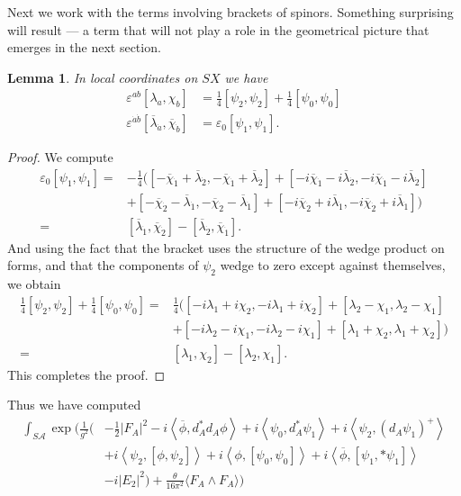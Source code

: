 \documentclass[twoside]{amsart}
\newtheorem{lemma}{Lemma}
\renewcommand{\epsilon}{\varepsilon}
\newcommand{\enm}[1]{\ensuremath{#1}}
\renewcommand{\aa}{\enm{\mathcal{A}}}
\newcommand{\sa}{\enm{S\aa}}
\newcommand{\ip}[2]{\enm{\left<#1,#2\right>}}
\renewcommand{\bar}[1]{\overline{#1}}
\renewcommand{\epsilon}{\varepsilon}
\newcommand{\cbi}[1]{\enm{\bar{\chi}_{\dot{#1}}}}
\newcommand{\lbi}[1]{\enm{\bar{\lambda}_{\dot{#1}}}}
\begin{document}
Next we work with the terms involving brackets of spinors.  Something
surprising will result --- a term that will not play a role in the
geometrical picture that emerges in the next section.
\begin{lemma}
    \label{lemma:brackets}
    In local coordinates on \( SX \) we have
    \begin{align}
        \epsilon^{ab}[\lambda_{a},\chi_{b}] &= \frac{1}{4}[\psi_{2},\psi_{2}] +
        \frac{1}{4}[\psi_{0},\psi_{0}] \\
        \epsilon^{\dot{a}\dot{b}}[\lbi{a},\cbi{b}] &=
        \epsilon_{0}[\psi_{1},\psi_{1}].
    \end{align}
\end{lemma}
\begin{proof} We compute
\begin{align*}
    \epsilon_{0}[\psi_{1},\psi_{1}] =&
    -\frac{1}{4}([-\cbi{1}+\lbi{2}, -\cbi{1}+\lbi{2}] +
    [-i\cbi{1}-i\lbi{2}, -i\cbi{1}-i\lbi{2}] \\ &+
    [-\cbi{2}-\lbi{1}, -\cbi{2}-\lbi{1}]+
    [-i\cbi{2}+i\lbi{1}, -i\cbi{2}+i\lbi{1}]) \\
    =& [\lbi{1},\cbi{2}] - [\lbi{2},\cbi{1}].
\end{align*}
And using the fact that the bracket uses the structure of the wedge
product on forms, and that the components of \( \psi_{2} \) wedge to
zero except against themselves, we obtain
\begin{align*}
    \frac{1}{4}[\psi_{2},\psi_{2}]+\frac{1}{4}[\psi_{0},\psi_{0}] =&
    \frac{1}{4}([-i\lambda_{1} + i\chi_{2}, -i\lambda_{1} + i\chi_{2}] +
    [\lambda_{2} - \chi_{1}, \lambda_{2} - \chi_{1}] \\
    &+
    [-i\lambda_{2} - i\chi_{1}, -i\lambda_{2} - i\chi_{1}] +
    [\lambda_{1} + \chi_{2}, \lambda_{1} + \chi_{2}]) \\
    =& [\lambda_{1},\chi_{2}]-[\lambda_{2},\chi_{1}].
\end{align*}
This completes the proof.
\end{proof}
Thus we have computed
\begin{align}
    \int_{\sa} %
  \exp\Big(\frac{1}{g^{2}}%
    \Big(
    &-\frac{1}{2}|F_{A}|^{2}
    - i\ip{\bar{\phi}}{d_{A}^{*}d_{A}\phi}
    +i\ip{\psi_{0}}{d_{A}^{*}\psi_{1}}
    + i\ip{\psi_{2}}{(d_{A}\psi_{1})^{+}}   \nonumber\\
    &+ i\ip{\psi_{2}}{[\phi, \psi_{2}]}
    + i\ip{\phi}{[\psi_{0},\psi_{0}]}
    + i\ip{\bar{\phi}}{[\psi_{1}, *\psi_{1}]} \\
    &- i|E_{2}|^{2}\Big)
    + \frac{\theta}{16\pi^{2}}\langle F_{A}\wedge F_{A}\rangle
    \Big)
\end{align}
\end{document}
